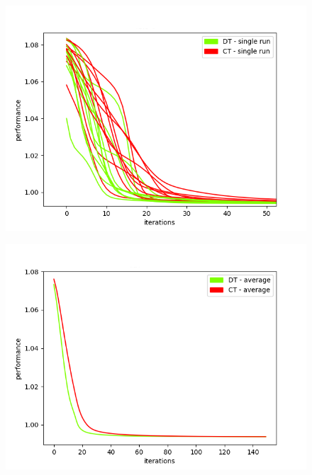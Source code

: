 \documentclass[thesis=M,english]{FITthesis}[2012/10/20]
\begin{document}
\begin{figure}
\centering
\begin{minipage}{.8\textwidth}
  \centering
  \includegraphics[width=1\linewidth]{img/ex1/1/single_runs_zoom50.png}
  \label{fig:sr50}
\end{minipage}
\begin{minipage}{.8\textwidth}
  \centering
  \includegraphics[width=.95\linewidth]{img/ex1/1/average.png}
  \label{fig:avgc}
\end{minipage}
\end{figure} 
\end{document}
